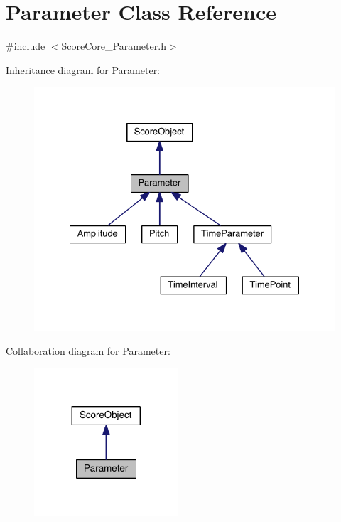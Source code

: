 \hypertarget{class_parameter}{\section{Parameter Class Reference}
\label{class_parameter}
}


{\ttfamily \#include $<$Score\-Core\-\_\-\-Parameter.\-h$>$}



Inheritance diagram for Parameter\-:\nopagebreak
\begin{figure}[H]
\begin{center}
\leavevmode
\includegraphics[width=331pt]{class_parameter__inherit__graph}
\end{center}
\end{figure}


Collaboration diagram for Parameter\-:\nopagebreak
\begin{figure}[H]
\begin{center}
\leavevmode
\includegraphics[width=152pt]{class_parameter__coll__graph}
\end{center}
\end{figure}
